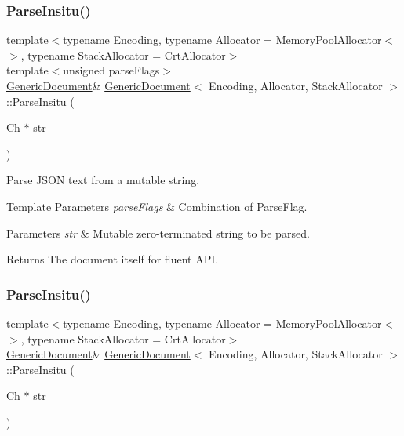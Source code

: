 \subsubsection{\texorpdfstring{Parse\+Insitu()}{ParseInsitu()}\hspace{0.1cm}{\footnotesize\ttfamily [3/4]}}
{\footnotesize\ttfamily template$<$typename Encoding, typename Allocator = Memory\+Pool\+Allocator$<$$>$, typename Stack\+Allocator = Crt\+Allocator$>$ \\
template$<$unsigned parse\+Flags$>$ \\
\hyperlink{classGenericDocument}{Generic\+Document}\& \hyperlink{classGenericDocument}{Generic\+Document}$<$ Encoding, Allocator, Stack\+Allocator $>$\+::Parse\+Insitu (\begin{DoxyParamCaption}\item[{\hyperlink{classGenericValue_ade0e0ce64ccd5d852da57a35e720bafb}{Ch} $\ast$}]{str }\end{DoxyParamCaption})\hspace{0.3cm}{\ttfamily [inline]}}



Parse J\+S\+ON text from a mutable string. 


\begin{DoxyTemplParams}{Template Parameters}
{\em parse\+Flags} & Combination of Parse\+Flag. \\
\hline
\end{DoxyTemplParams}

\begin{DoxyParams}{Parameters}
{\em str} & Mutable zero-\/terminated string to be parsed. \\
\hline
\end{DoxyParams}
\begin{DoxyReturn}{Returns}
The document itself for fluent A\+PI. 
\end{DoxyReturn}
\mbox{\label{classGenericDocument_a81922881357539d5482d31aea14b5664}} 
\subsubsection{\texorpdfstring{Parse\+Insitu()}{ParseInsitu()}\hspace{0.1cm}{\footnotesize\ttfamily [4/4]}}
{\footnotesize\ttfamily template$<$typename Encoding, typename Allocator = Memory\+Pool\+Allocator$<$$>$, typename Stack\+Allocator = Crt\+Allocator$>$ \\
\hyperlink{classGenericDocument}{Generic\+Document}\& \hyperlink{classGenericDocument}{Generic\+Document}$<$ Encoding, Allocator, Stack\+Allocator $>$\+::Parse\+Insitu (\begin{DoxyParamCaption}\item[{\hyperlink{classGenericValue_ade0e0ce64ccd5d852da57a35e720bafb}{Ch} $\ast$}]{str }\end{DoxyParamCaption})\hspace{0.3cm}{\ttfamily [inline]}}



